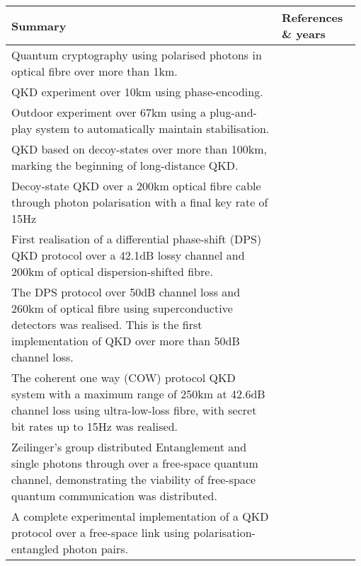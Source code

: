 \begin{table*}[!htbp]
\begin{tabular}{|p{0.755\linewidth}|p{0.22\linewidth}|}
	\hline
	\textbf{Summary} & \textbf{References \& years} \\	\hline \hline
	Quantum cryptography using polarised photons in optical fibre over more than 1km. & \cite{bib:EL_23_383} \\
	\hline
	QKD experiment over 10km using phase-encoding. & \cite{bib:EL_29_634} \\
	\hline
	Outdoor experiment over 67km using a plug-and-play system to automatically maintain stabilisation. & \cite{bib:Arx0203118} \\
	\hline
	QKD based on decoy-states over more than 100km, marking the beginning of long-distance QKD. & \cite{bib:PRL_98_010505, bib:PRL_98_010504, bib:rosenberg2007long} \\
	\hline
	Decoy-state QKD over a 200km optical fibre cable through photon polarisation with a final key rate of 15Hz & \cite{bib:OptExp_18_8587} \\
	\hline
	First realisation of a differential phase-shift (DPS) QKD protocol over a 42.1dB lossy channel and 200km of optical dispersion-shifted fibre. & \cite{bib:NP_1_343} \\
	\hline
	The DPS protocol over 50dB channel loss and 260km of optical fibre using superconductive detectors was realised. This is the first implementation of QKD over more than 50dB channel loss.&\cite{bib:OL_37_1008}\\
	\hline
	The coherent one way (COW) protocol QKD system with a maximum range of 250km at 42.6dB channel loss using ultra-low-loss fibre, with secret bit rates up to 15Hz was realised.&\cite{bib:NJP_11_075003}\\
	\hline
	Zeilinger's group distributed Entanglement and single photons through over a free-space quantum channel, demonstrating the viability of free-space quantum communication was distributed.& \cite{bib:OE_13_202}\\
	\hline
	A complete experimental implementation of a QKD protocol over a free-space link using polarisation-entangled photon pairs.&\cite{bib:APL_89_101122}\\

\end{tabular}
\end{table*}
